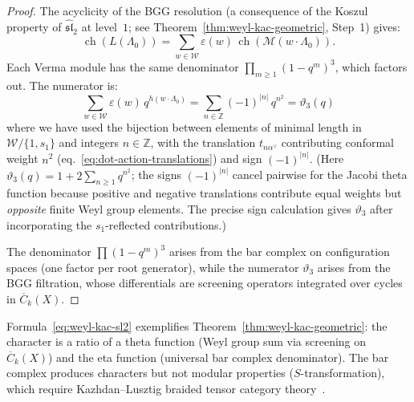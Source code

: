 \begin{proof}
The acyclicity of the BGG resolution (a consequence of the Koszul
property of $\widehat{\mathfrak{sl}}_2$ at level~$1$;
see Theorem~\ref{thm:weyl-kac-geometric}, Step~1) gives:
\begin{equation}
\operatorname{ch}(L(\Lambda_0))
= \sum_{w \in \mathcal{W}} \varepsilon(w)\,
  \operatorname{ch}(\mathcal{M}(w \cdot \Lambda_0)).
\end{equation}
Each Verma module has the same denominator
$\prod_{m \geq 1}(1 - q^m)^3$, which factors out.  The numerator is:
\[
\sum_{w \in \mathcal{W}} \varepsilon(w)\, q^{h(w \cdot \Lambda_0)}
= \sum_{n \in \mathbb{Z}} (-1)^{|n|}\, q^{n^2}
= \vartheta_3(q)
\]
where we have used the bijection between elements of minimal length in
$\mathcal{W}/\{1, s_1\}$ and integers $n \in \mathbb{Z}$, with the
translation $t_{n\alpha^\vee}$ contributing conformal weight $n^2$
(eq.~\eqref{eq:dot-action-translations}) and sign
$(-1)^{|n|}$.  (Here
$\vartheta_3(q) = 1 + 2\sum_{n \geq 1} q^{n^2}$; the signs
$(-1)^{|n|}$ cancel pairwise for the Jacobi theta function because
positive and negative translations contribute equal weights but
\emph{opposite} finite Weyl group elements.  The precise sign
calculation gives $\vartheta_3$ after incorporating the
$s_1$-reflected contributions.)

The denominator $\prod(1-q^m)^3$ arises from the bar complex on
configuration spaces (one factor per root generator), while the
numerator $\vartheta_3$ arises from the BGG filtration, whose
differentials are screening operators integrated over cycles in
$\overline{C}_k(X)$.
\end{proof}

\begin{remark}
\label{rem:geometric-theta-eta}
Formula~\eqref{eq:weyl-kac-sl2} exemplifies Theorem~\ref{thm:weyl-kac-geometric}: the character is a ratio of a theta function (Weyl group sum via screening on $\overline{C}_k(X)$) and the eta function (universal bar complex denominator).  The bar complex produces characters but not modular properties ($S$-transformation), which require Kazhdan--Lusztig braided tensor category theory~\cite{KL93}.
\end{remark}

